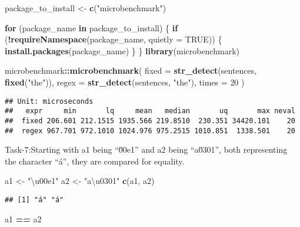 \documentclass[
]{article}
\newenvironment{Shaded}{\begin{snugshade}}{\end{snugshade}}
\newcommand{\AttributeTok}[1]{\textcolor[rgb]{0.13,0.29,0.53}{#1}}
\newcommand{\ConstantTok}[1]{\textcolor[rgb]{0.56,0.35,0.01}{#1}}
\newcommand{\ControlFlowTok}[1]{\textcolor[rgb]{0.13,0.29,0.53}{\textbf{#1}}}
\newcommand{\DecValTok}[1]{\textcolor[rgb]{0.00,0.00,0.81}{#1}}
\newcommand{\FunctionTok}[1]{\textcolor[rgb]{0.13,0.29,0.53}{\textbf{#1}}}
\newcommand{\NormalTok}[1]{#1}
\newcommand{\OtherTok}[1]{\textcolor[rgb]{0.56,0.35,0.01}{#1}}
\newcommand{\SpecialCharTok}[1]{\textcolor[rgb]{0.81,0.36,0.00}{\textbf{#1}}}
\newcommand{\StringTok}[1]{\textcolor[rgb]{0.31,0.60,0.02}{#1}}
\begin{document}
\begin{Shaded}
\begin{Highlighting}[]
\NormalTok{package\_to\_install }\OtherTok{\textless{}{-}} \FunctionTok{c}\NormalTok{(}\StringTok{"microbenchmark"}\NormalTok{)}

\ControlFlowTok{for}\NormalTok{ (package\_name }\ControlFlowTok{in}\NormalTok{ package\_to\_install) \{}
  \ControlFlowTok{if}\NormalTok{ (}\SpecialCharTok{!}\FunctionTok{requireNamespace}\NormalTok{(package\_name, }\AttributeTok{quietly =} \ConstantTok{TRUE}\NormalTok{)) \{}
    \FunctionTok{install.packages}\NormalTok{(package\_name)}
\NormalTok{  \}}
\NormalTok{\}}
\FunctionTok{library}\NormalTok{(microbenchmark)}

\NormalTok{microbenchmark}\SpecialCharTok{::}\FunctionTok{microbenchmark}\NormalTok{(}
  \AttributeTok{fixed =} \FunctionTok{str\_detect}\NormalTok{(sentences, }\FunctionTok{fixed}\NormalTok{(}\StringTok{"the"}\NormalTok{)),}
  \AttributeTok{regex =} \FunctionTok{str\_detect}\NormalTok{(sentences, }\StringTok{"the"}\NormalTok{),}
  \AttributeTok{times =} \DecValTok{20}
\NormalTok{  )}
\end{Highlighting}
\end{Shaded}

\begin{verbatim}
## Unit: microseconds
##   expr     min       lq     mean   median       uq       max neval
##  fixed 206.601 212.1515 1935.566 219.8510  230.351 34420.101    20
##  regex 967.701 972.1010 1024.976 975.2515 1010.851  1338.501    20
\end{verbatim}

Task-7:Starting with a1 being ``\u00e1'' and a2 being ``a\u0301'', both
representing the character ``á'', they are compared for equality.

\begin{Shaded}
\begin{Highlighting}[]
\NormalTok{a1 }\OtherTok{\textless{}{-}} \StringTok{"\textbackslash{}u00e1"}
\NormalTok{a2 }\OtherTok{\textless{}{-}} \StringTok{"a\textbackslash{}u0301"}
\FunctionTok{c}\NormalTok{(a1, a2)}
\end{Highlighting}
\end{Shaded}

\begin{verbatim}
## [1] "á" "á"
\end{verbatim}

\begin{Shaded}
\begin{Highlighting}[]
\NormalTok{a1 }\SpecialCharTok{==}\NormalTok{ a2}
\end{Highlighting}
\end{Shaded}
\end{document}
